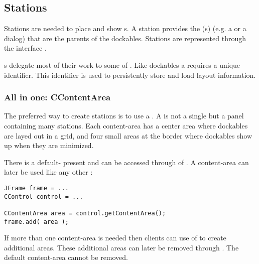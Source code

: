 \subsection{Stations}
Stations are needed to place and show s. A station provides the (s) (e.g. a  or a dialog) that are the parents of the dockables. Stations are represented through the interface .

s delegate most of their work to some  of . Like dockables a  requires a unique identifier. This identifier is used to persistently store and load layout information.


\subsubsection{All in one: CContentArea}
The preferred way to create stations is to use a . A  is not a single  but a panel containing many stations. Each content-area has a center area where dockables are layed out in a grid, and four small areas at the border where dockables show up when they are minimized.

There is a default- present and can be accessed through \linebreak {} of . A content-area can later be used like any other :
\begin{lstlisting}
JFrame frame = ...
CControl control = ...

CContentArea area = control.getContentArea();
frame.add( area );
\end{lstlisting}

If more than one content-area is needed then clients can use \linebreak {} of  to create additional areas. These additional areas can later be removed through . The default content-area cannot be removed.


